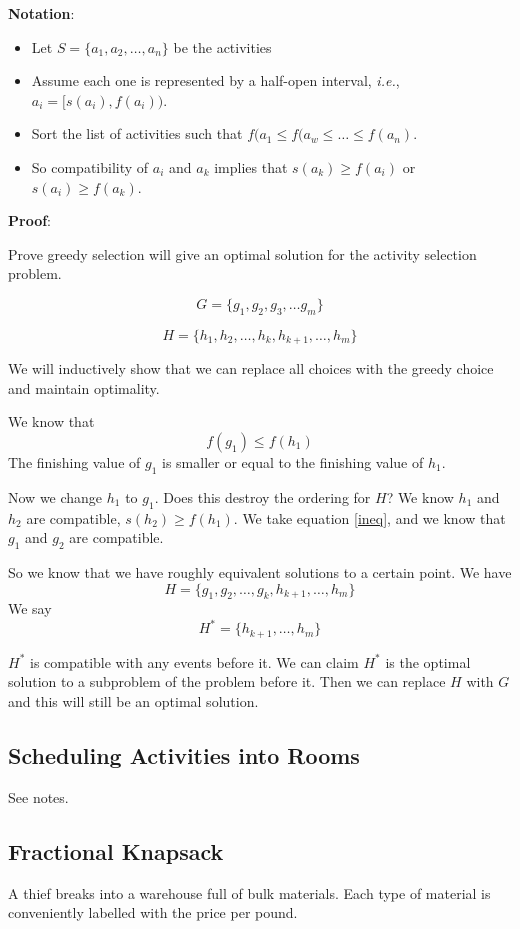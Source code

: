\documentclass[12pt]{article}
\begin{document}
\textbf{Notation}:

\begin{itemize}
	\item Let $S = \{a_1, a_2,\dots,a_n\}$ be the activities
	\item Assume each one is represented by a half-open interval, \textit{i.e.},
		$a_i = [s(a_i),f(a_i))$.
	\item Sort the list of activities such that $f(a_1 \le f(a_w\le \dots \le
		f(a_n)$.
	\item So compatibility of $a_i$ and $a_k$ implies that $s(a_k) \ge f(a_i)$
		or $s(a_i) \ge f(a_k)$.
\end{itemize}

\textbf{Proof}:

Prove greedy selection will give an optimal solution for the activity selection
problem.

\begin{equation}
	G = \{g_1,g_2,g_3,\dots g_m\}
\end{equation}

\begin{equation}
	H = \{h_1,h_2,\dots,h_k,h_{k+1},\dots,h_m\}
\end{equation}

We will inductively show that we can replace all choices with the greedy choice
and maintain optimality.

We know that
\begin{equation}
	f(g_1) \le f(h_1)
	\label{ineq}
\end{equation}
The finishing value of $g_1$ is smaller or equal to the finishing value of
$h_1$.

Now we change $h_1$ to $g_1$. Does this destroy the ordering for $H$? We know
$h_1$ and $h_2$ are compatible, $s(h_2) \ge f(h_1)$. We take equation
\eqref{ineq}, and we know that $g_1$ and $g_2$ are compatible.

So we know that we have roughly equivalent solutions to a certain point. We have
\begin{equation}
	H = \{g_1,g_2,\dots,g_k,h_{k+1},\dots,h_m\}
	\label{newH}
\end{equation}
We say
\begin{equation}
	H^* = \{h_{k+1},\dots,h_m\}
	\label{starH}
\end{equation}

$H^*$ is compatible with any events before it. We can claim $H^*$ is the optimal
solution to a subproblem of the problem before it. Then we can replace $H$ with
$G$ and this will still be an optimal solution.

\subsection{Scheduling Activities into Rooms}

See notes.

\subsection{Fractional Knapsack}

A thief breaks into a warehouse full of bulk materials. Each type of material is
conveniently labelled with the price per pound.
\end{document}
